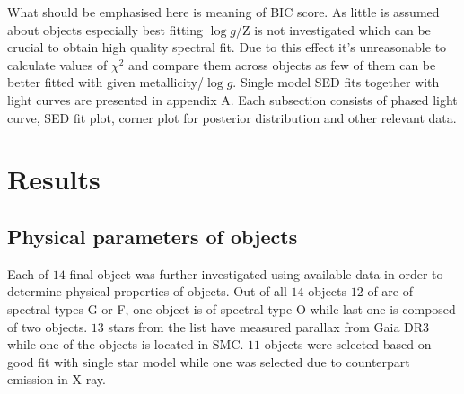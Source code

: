 \documentclass{pracalicmgr}
\begin{document}
What should be emphasised here is meaning of BIC score. As little is assumed about objects especially best fitting 
$\log{g}$/Z is not investigated which can be crucial to obtain high quality spectral fit. Due to this effect it's unreasonable to calculate values of $\chi^2$ and compare them 
across objects as few of them can be better fitted with given metallicity/$\log{g}$.
Single model SED fits together with light curves are presented in appendix A. Each subsection consists of phased light curve, 
SED fit plot, corner plot for posterior distribution and other relevant data.
\chapter{Results}
\section{Physical parameters of objects}
Each of $14$ final object was further investigated using available data in order to determine physical properties of objects.
Out of all $14$ objects $12$ of are of spectral types G or F, one object is of spectral type O while last one is composed of two objects.
$13$ stars from the list have measured parallax from Gaia DR3 while one of the objects is located in SMC.
$11$ objects were selected based on good fit with single star model while one was selected due to counterpart emission in X-ray.
\end{document}
